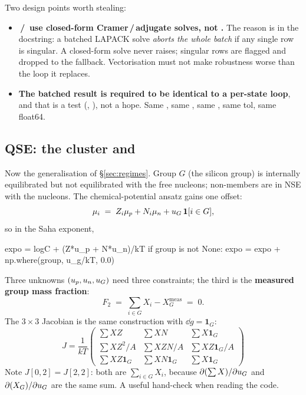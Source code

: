Two design points worth stealing:

\begin{itemize}
\item \textbf{\,/\, use
  closed-form Cramer\,/\,adjugate solves, not .} The reason
  is in the docstring: a batched LAPACK solve \emph{aborts the whole batch} if
  any single row is singular. A closed-form solve never raises; singular rows
  are flagged and dropped to the fallback. Vectorisation must not make
  robustness worse than the loop it replaces.
\item \textbf{The batched result is required to be identical to a per-state
  loop}, and that is a test (,
  ), not a hope. Same
  , same , same , same
  tol, same float64.
\end{itemize}

\subsection{QSE: the cluster and \texorpdfstring{\uG}{uG}}
\label{sec:qsecluster}

Now the generalisation of \S\ref{sec:regimes}. Group $G$ (the silicon group) is
internally equilibrated but not equilibrated with the free nucleons; non-members
are in NSE with the nucleons. The chemical-potential ansatz gains one offset:
%
\begin{equation}
\mu_i \;=\; Z_i\mu_p + N_i\mu_n + u_{G}\,\mathbf{1}[i\in G],
\label{eq:qseansatz}
\end{equation}
%
so in the Saha exponent,

\begin{srclisting}
expo = logC + (Z*u_p + N*u_n)/kT
if group is not None:
    expo = expo + np.where(group, u_g/kT, 0.0)
\end{srclisting}

Three unknowns $(u_{p}, u_{n}, u_{G})$ need three constraints; the third is the
\textbf{measured group mass fraction}:
%
\begin{equation}
F_2 \;=\; \sum_{i\in G} X_i - X_G^{\mathrm{meas}} \;=\; 0 .
\label{eq:qseF2}
\end{equation}
%
The $3\times3$ Jacobian is the same construction with
$\dd g = \mathbf{1}_G$:
%
\begin{equation}
J = \frac{1}{kT}\begin{pmatrix}
\sum XZ & \sum XN & \sum X\mathbf{1}_G\\
\sum XZ^2/A & \sum XZN/A & \sum XZ\mathbf{1}_G/A\\
\sum XZ\mathbf{1}_G & \sum XN\mathbf{1}_G & \sum X\mathbf{1}_G
\end{pmatrix}
\label{eq:qsejacobian}
\end{equation}
%
Note $J[0,2] = J[2,2]$: both are $\sum_{i\in G} X_i$, because
$\partial(\sum X)/\partial u_{G}$ and $\partial(X_G)/\partial u_{G}$ are the same sum.
A useful hand-check when reading the code.

